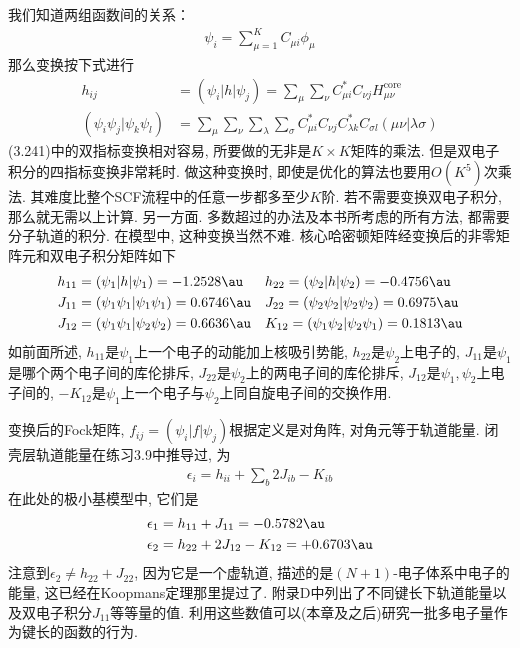 我们知道两组函数间的关系：
\begin{align}
	\psi_i = \sum_{\mu=1}^{K}C_{\mu i}\phi_\mu
\end{align}
那么变换按下式进行
\begin{align}
	h_{ij} & = (\psi_i|h|\psi_j) = \sum_{\mu}\sum_{\nu}C_{\mu i}^*C_{\nu j}H_{\mu\nu}^\mathrm{core}\\
	(\psi_i\psi_j|\psi_k\psi_l) & = \sum_\mu\sum_\nu\sum_\lambda\sum_\sigma C_{\mu i}^*C_{\nu j}C_{\lambda k}^*C_{\sigma l}(\mu\nu|\lambda\sigma)
\end{align}
(3.241)中的双指标变换相对容易, 所要做的无非是$K\times K$矩阵的乘法. 
但是双电子积分的四指标变换非常耗时. 做这种变换时, 即使是优化的算法也要用$O(K^5)$次乘法. 其难度比整个SCF流程中的任意一步都多至少$K$阶. 
若不需要变换双电子积分, 那么就无需以上计算. 另一方面. 多数超过\hft 的办法及本书所考虑的所有方法, 都需要分子轨道的积分. 
在模型中, 这种变换当然不难. 
核心哈密顿矩阵经变换后的非零矩阵元和双电子积分矩阵如下
\begin{align*}
	h_{11} & =(\psi_1|h|\psi_1)=-1.2528\au          &  & h_{22}=(\psi_2|h|\psi_2)=-0.4756\au          \\
	J_{11} & =(\psi_1\psi_1|\psi_1\psi_1)=0.6746\au &  & J_{22}=(\psi_2\psi_2|\psi_2\psi_2)=0.6975\au \\
	J_{12} & =(\psi_1\psi_1|\psi_2\psi_2)=0.6636\au &  & K_{12}=(\psi_1\psi_2|\psi_2\psi_1)=0.1813\au
\end{align*}
如前面所述, 
$h_{11}$是$\psi_1$上一个电子的动能加上核吸引势能, 
$h_{22}$是$\psi_2$上电子的, 
$J_{11}$是$\psi_1$是哪个两个电子间的库伦排斥, 
$J_{22}$是$\psi_2$上的两电子间的库伦排斥, 
$J_{12}$是$\psi_1,\psi_2$上电子间的, 
$-K_{12}$是$\psi_1$上一个电子与$\psi_2$上同自旋电子间的交换作用.


变换后的Fock矩阵, 
$f_{ij}=(\psi_i|f|\psi_j)$根据定义是对角阵, 
对角元等于轨道能量. 
闭壳层轨道能量在练习3.9中推导过, 
为
\begin{align}
	\epsilon_i = h_{ii} + \sum_b2J_{ib} -K_{ib}
\end{align}
在此处的极小基模型中, 
它们是
\begin{align}
	\epsilon_1 & = h_{11} + J_{11} = -0.5782\au\\
	\epsilon_2 & = h_{22} + 2J_{12} - K_{12} = +0.6703\au
\end{align}
注意到$\epsilon_2\neq h_{22}+J_{22}$, 
因为它是一个虚轨道, 
描述的是$(N+1)$-电子体系中电子的能量, 
这已经在Koopmans定理那里提过了. 
附录D中列出了不同键长下轨道能量以及双电子积分$J_{11}$等等量的值. 
利用这些数值可以(本章及之后)研究一批多电子量作为键长的函数的行为.


